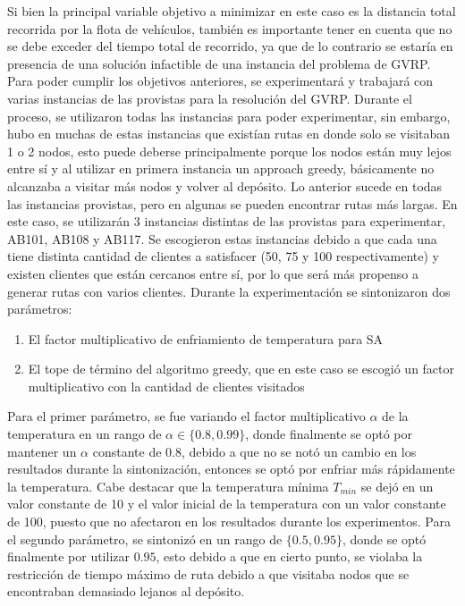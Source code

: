 \documentclass[letter, 10pt]{article}
\begin{document}
Si bien la principal variable objetivo a minimizar en este caso es la distancia total recorrida por la flota de vehículos, también es importante tener en cuenta que no se debe exceder del tiempo total de recorrido, ya que de lo contrario se estaría en presencia de una solución infactible de una instancia del problema de GVRP.
\\

Para poder cumplir los objetivos anteriores, se experimentará y trabajará con varias instancias de las provistas para la resolución del GVRP. Durante el proceso, se utilizaron todas las instancias para poder experimentar, sin embargo, hubo en muchas de estas instancias que existían rutas en donde solo se visitaban 1 o 2 nodos, esto puede deberse principalmente porque los nodos están muy lejos entre sí y al utilizar en primera instancia un approach greedy, básicamente no alcanzaba a visitar más nodos y volver al depósito. Lo anterior sucede en todas las instancias provistas, pero en algunas se pueden encontrar rutas más largas. En este caso, se utilizarán 3 instancias distintas de las provistas para experimentar, AB101, AB108 y AB117. Se escogieron estas instancias debido a que cada una tiene distinta cantidad de clientes a satisfacer (50, 75 y 100 respectivamente) y existen clientes que están cercanos entre sí, por lo que será más propenso a generar rutas con varios clientes. Durante la experimentación se sintonizaron dos parámetros:

\begin{enumerate}
    \item El factor multiplicativo de enfriamiento de temperatura para SA
    \item El tope de término del algoritmo greedy, que en este caso se escogió un factor multiplicativo con la cantidad de clientes visitados
\end{enumerate}

Para el primer parámetro, se fue variando el factor multiplicativo $\alpha$ de la temperatura en un rango de $\alpha \in \{0\text{.}8, 0\text{.}99\}$, donde finalmente se optó por mantener un $\alpha$ constante de $0.8$, debido a que no se notó un cambio en los resultados durante la sintonización, entonces se optó por enfriar más rápidamente la temperatura. Cabe destacar que la temperatura mínima $T_{min}$ se dejó en un valor constante de 10 y el valor inicial de la temperatura con un valor constante de 100, puesto que no afectaron en los resultados durante los experimentos. Para el segundo parámetro, se sintonizó en un rango de $\{0\text{.}5, 0\text{.}95\}$, donde se optó finalmente por utilizar $0\text{.}95$, esto debido a que en cierto punto, se violaba la restricción de tiempo máximo de ruta debido a que visitaba nodos que se encontraban demasiado lejanos al depósito.
\\
\end{document}
